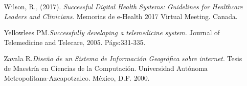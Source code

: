 \begin{thebibliography}{}
 Wilson, R., (2017). \textit{Successful Digital Health Systems: Guidelines for Healthcare Leaders and Clinicians}. Memorias de e-Health 2017 Virtual Meeting. Canada.

 Yellowlees PM.\textit{Successfully developing a telemedicine system.} Journal of Telemedicine and Telecare, 2005. Págs:331-335.

 Zavala R.\textit{Diseño de un Sistema de Información Geográfica sobre internet.} Tesis de Maestría en Ciencias de la Computación. Universidad Autónoma Metropolitana-Azcapotzalco. México, D.F. 2000.

\end{thebibliography}
